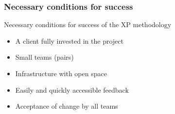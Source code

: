 \begin{frame}
    \frametitle{Necessary conditions for success}
        \begin{block}{Necessary conditions for success of the XP methodology}
            \begin{itemize}
                \item A client fully invested in the project
                \item Small teams (pairs)
                \item Infrastructure with open space
                \item Easily and quickly accessible feedback
                \item Acceptance of change by all teams
            \end{itemize}
        \end{block}
\end{frame}
